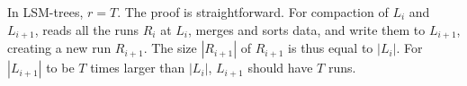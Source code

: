 In LSM-trees, $r = T$.  The proof is straightforward.  For compaction
of $L_i$ and $L_{i+1}$, \ours{} reads all the runs $R_i$ at $L_i$, merges and
sorts data, and write them to $L_{i+1}$, creating a new run $R_{i+1}$.
The size $|R_{i+1}|$ of $R_{i+1}$ is thus equal to $|L_i|$.  For $|L_{i+1}|$ to
be $T$ times larger than $|L_{i}|$, $L_{i+1}$ should have $T$ runs.  


